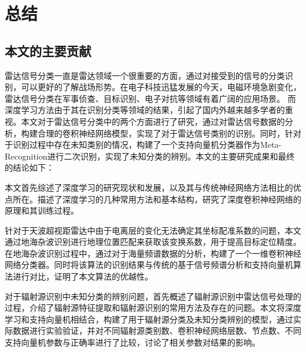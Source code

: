 \chapter{总结}
\section{本文的主要贡献}
雷达信号分类一直是雷达领域一个很重要的方面，通过对接受到的信号的分类识别，可以更好的了解战场形势。在电子科技迅猛发展的今天，电磁环境急剧变化，雷达信号分类在军事侦查、目标识别、电子对抗等领域有着广阔的应用场景。
而深度学习方法由于其在识别分类等领域的结果，引起了国内外越来越多学者的重视。本文对于雷达信号分类中的两个方面进行了研究，通过对雷达信号数据的分析，构建合理的卷积神经网络模型，实现了对于雷达信号类别的识别。同时，针对于识别过程中存在未知类别的情况，构建了一个支持向量机分类器作为Meta-Recognition进行二次识别，实现了未知分类的辨别。本文的主要研究成果和最终的结论如下：

本文首先综述了深度学习的研究现状和发展，以及其与传统神经网络方法相比的优点所在。描述了深度学习的几种常用方法和基本结构，研究了深度卷积神经网络的原理和其训练过程。

针对于天波超视距雷达中由于电离层的变化无法确定其坐标配准系数的问题，本文通过地海杂波识别进行地理位置匹配来获取该变换系数，用于提高目标定位精度。在地海杂波识别过程中，通过对于海量频谱数据的分析，构建了一个一维卷积神经网络分类器。同时将该算法的识别结果与传统的基于信号频谱分析和支持向量机算法进行对比，证明了本文算法的优越性。

对于辐射源识别中未知分类的辨别问题，首先概述了辐射源识别中雷达信号处理的过程，介绍了辐射源特征提取和辐射源识别的常用方法及存在的问题。本文将深度学习和支持向量机相结合，构建了用于辐射源分类及未知分类辨别的模型，通过实际数据进行实验验证，并对不同辐射源类别数、卷积神经网络层数、节点数、不同支持向量机参数与正确率进行了比较，讨论了相关参数对结果的影响。

